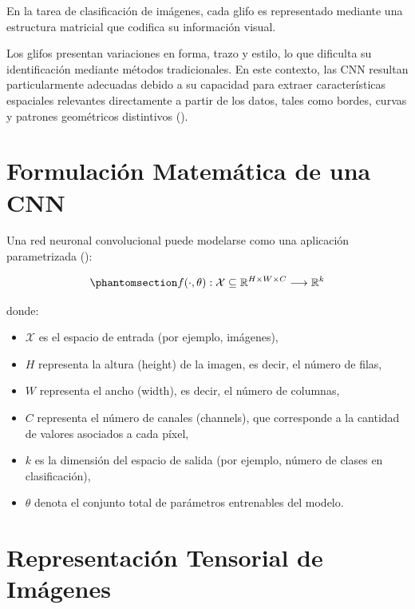 \documentclass[
  spanish,
  us-letterpaper,
]{scrreprt}
\providecommand{\tightlist}{%
  \setlength{\itemsep}{0pt}\setlength{\parskip}{0pt}}
\theoremstyle{definition}
\theoremstyle{remark}
\begin{document}
En la tarea de clasificación de imágenes, cada glifo es representado
mediante una estructura matricial que codifica su información visual.

Los glifos presentan variaciones en forma, trazo y estilo, lo que
dificulta su identificación mediante métodos tradicionales. En este
contexto, las CNN resultan particularmente adecuadas debido a su
capacidad para extraer características espaciales relevantes
directamente a partir de los datos, tales como bordes, curvas y patrones
geométricos distintivos ().

\section{Formulación Matemática de una
CNN}\label{formulaciuxf3n-matemuxe1tica-de-una-cnn}

Una red neuronal convolucional puede modelarse como una aplicación
parametrizada ():

\begin{equation}\phantomsection\label{eq-cnn-formal}{
f(\cdot , \theta): \mathcal{X} \subseteq \mathbb{R}^{H \times W \times C} \longrightarrow \mathbb{R}^{k}
}\end{equation}

donde:

\begin{itemize}
\tightlist
\item
  \(\mathcal{X}\) es el espacio de entrada (por ejemplo, imágenes),
\item
  \(H\) representa la altura (height) de la imagen, es decir, el número
  de filas,
\item
  \(W\) representa el ancho (width), es decir, el número de columnas,
\item
  \(C\) representa el número de canales (channels), que corresponde a la
  cantidad de valores asociados a cada píxel,
\item
  \(k\) es la dimensión del espacio de salida (por ejemplo, número de
  clases en clasificación),
\item
  \(\theta\) denota el conjunto total de parámetros entrenables del
  modelo.
\end{itemize}

\section{Representación Tensorial de
Imágenes}\label{representaciuxf3n-tensorial-de-imuxe1genes}
\end{document}
